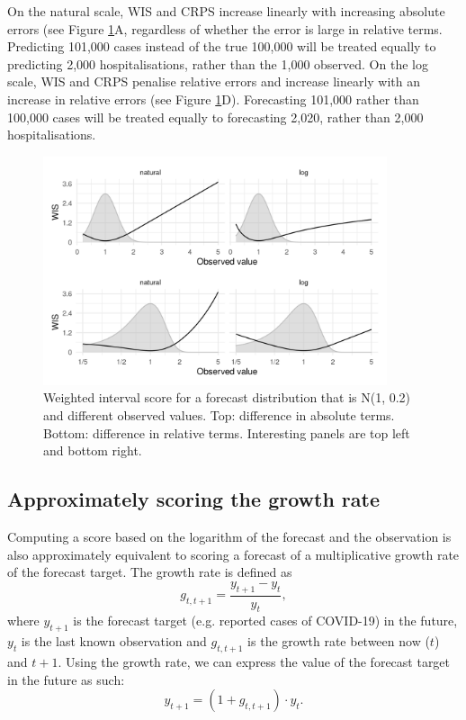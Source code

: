\documentclass{article}
\begin{document}
On the natural scale, WIS and CRPS increase linearly with increasing absolute errors (see Figure \ref{fig:change-in-scores}A, regardless of whether the error is large in relative terms. Predicting 101,000 cases instead of the true 100,000 will be treated equally to predicting 2,000 hospitalisations, rather than the 1,000 observed. On the log scale, WIS and CRPS penalise relative errors and increase linearly with an increase in relative errors (see Figure \ref{fig:change-in-scores}D). Forecasting 101,000 rather than 100,000 cases will be treated equally to forecasting 2,020, rather than 2,000 hospitalisations. 

\begin{figure}[h!]
    \centering
    \includegraphics[width=0.9\textwidth]{output/figures/SIM-effect-log-score.png}
    \caption{Weighted interval score for a forecast distribution that is N(1, 0.2) and different observed values. Top: difference in absolute terms. Bottom: difference in relative terms. Interesting panels are top left and bottom right.} 
    \label{fig:change-in-scores}
\end{figure}

\subsection{Approximately scoring the growth rate}
Computing a score based on the logarithm of the forecast and the observation is also approximately equivalent to scoring a forecast of a multiplicative growth rate of the forecast target. The growth rate is defined as
%
\begin{equation}
    g_{t, t+1} = \frac{y_{t+1} - y_t}{y_t},
\end{equation}
%
where $y_{t+1}$ is the forecast target (e.g. reported cases of COVID-19) in the future, $y_t$ is the last known observation and $g_{t, t+1}$ is the growth rate between now ($t$) and $t+1$. 
Using the growth rate, we can express the value of the forecast target in the future as such: 
%
\begin{equation}
y_{t+1} = (1 + g_{t, t+1}) \cdot y_t.
\end{equation}
%
\end{document}
